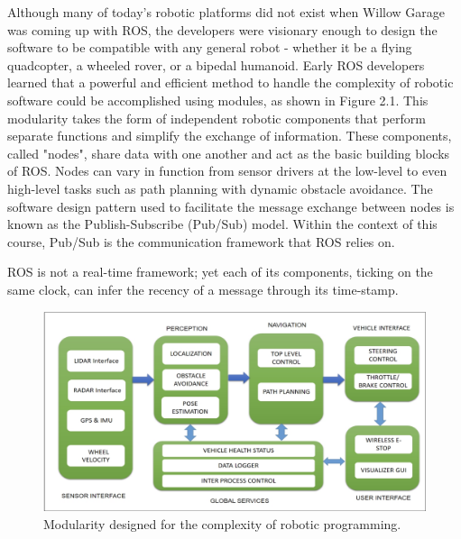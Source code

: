 \documentclass[twoside]{article}
\begin{document}
Although many of today's robotic platforms did not exist when Willow Garage was coming up with ROS, the developers were visionary enough to design the software to be compatible with any general robot - whether it be a flying quadcopter, a wheeled rover, or a bipedal humanoid. Early ROS developers learned that a powerful and efficient method to handle the complexity of robotic software could be accomplished using modules, as shown in Figure 2.1. This modularity takes the form of independent robotic components that perform separate functions and simplify the exchange of information. These components, called "nodes", share data with one another and act as the basic building blocks of ROS. Nodes can vary in function from sensor drivers at the low-level to even high-level tasks such as path planning with dynamic obstacle avoidance. The software design pattern used to facilitate the message exchange between nodes is known as the Publish-Subscribe (Pub/Sub) model. Within the context of this course, Pub/Sub is the communication framework that ROS relies on.

ROS is not a real-time framework; yet each of its components, ticking on the same clock, can infer the recency of a message through its time-stamp. 
\begin{figure}[ht]
\centering
\includegraphics[width=1\textwidth]{ModularityPhoto}
\caption{Modularity designed for the complexity of robotic programming.}
\end{figure}
\end{document}
